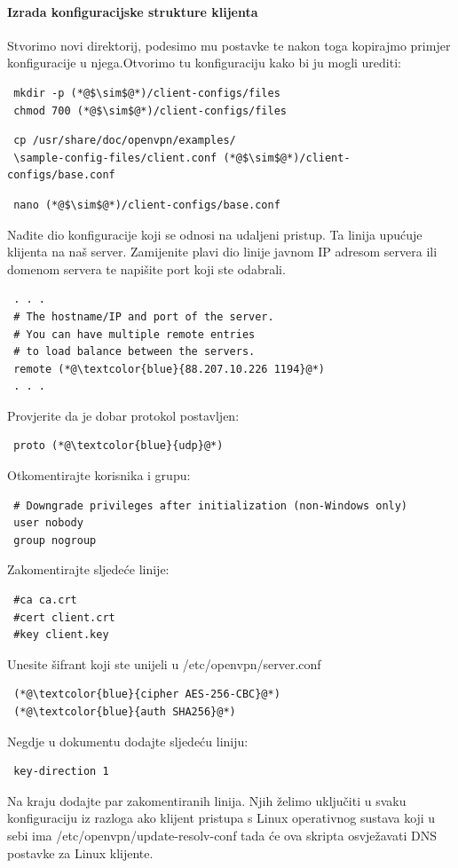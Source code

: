 \paragraph*{Izrada konfiguracijske strukture klijenta}
\hfill \smallbreak
Stvorimo novi direktorij, podesimo mu postavke te nakon toga kopirajmo primjer konfiguracije u njega.Otvorimo tu konfiguraciju kako bi ju mogli urediti:
\begin{lstlisting}
 mkdir -p (*@$\sim$@*)/client-configs/files
 chmod 700 (*@$\sim$@*)/client-configs/files
\end{lstlisting}
\begin{lstlisting}
 cp /usr/share/doc/openvpn/examples/
 \sample-config-files/client.conf (*@$\sim$@*)/client-configs/base.conf
\end{lstlisting}
\begin{lstlisting}
 nano (*@$\sim$@*)/client-configs/base.conf
\end{lstlisting}
Nađite dio konfiguracije koji se odnosi na udaljeni pristup. Ta linija upućuje klijenta na naš server. Zamijenite plavi dio linije javnom IP adresom servera ili domenom servera te napišite port koji ste odabrali.
\begin{lstlisting}
 . . .
 # The hostname/IP and port of the server.
 # You can have multiple remote entries
 # to load balance between the servers.
 remote (*@\textcolor{blue}{88.207.10.226 1194}@*)
 . . .
\end{lstlisting}
Provjerite da je dobar protokol postavljen:
\begin{lstlisting}
 proto (*@\textcolor{blue}{udp}@*)
\end{lstlisting}
Otkomentirajte korisnika i grupu:
\begin{lstlisting}
 # Downgrade privileges after initialization (non-Windows only)
 user nobody
 group nogroup
\end{lstlisting}
Zakomentirajte sljedeće linije:
\begin{lstlisting}
 #ca ca.crt
 #cert client.crt
 #key client.key
\end{lstlisting}
Unesite šifrant koji ste unijeli u /etc/openvpn/server.conf
\begin{lstlisting}
 (*@\textcolor{blue}{cipher AES-256-CBC}@*)
 (*@\textcolor{blue}{auth SHA256}@*)
\end{lstlisting}
Negdje u dokumentu dodajte sljedeću liniju:
\begin{lstlisting}
 key-direction 1
\end{lstlisting}
Na kraju dodajte par zakomentiranih linija. Njih želimo uključiti u svaku konfiguraciju iz razloga ako klijent pristupa s Linux operativnog sustava koji u sebi ima /etc/openvpn/update-resolv-conf tada će ova skripta osvježavati DNS postavke za Linux klijente.
